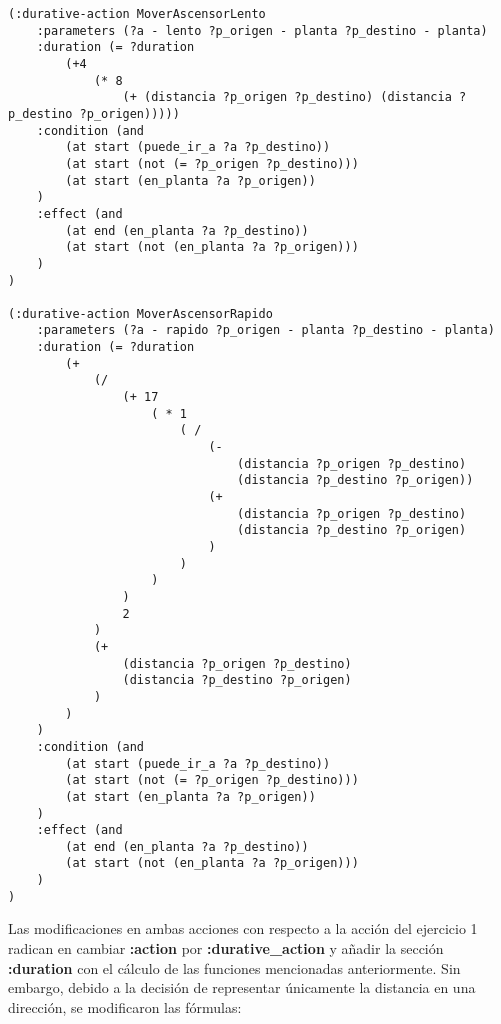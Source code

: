 \documentclass{article}
\begin{document}
\begin{verbatim}
(:durative-action MoverAscensorLento
    :parameters (?a - lento ?p_origen - planta ?p_destino - planta)
    :duration (= ?duration
        (+4
            (* 8
                (+ (distancia ?p_origen ?p_destino) (distancia ?p_destino ?p_origen)))))
    :condition (and
        (at start (puede_ir_a ?a ?p_destino))
        (at start (not (= ?p_origen ?p_destino)))
        (at start (en_planta ?a ?p_origen))
    )
    :effect (and
        (at end (en_planta ?a ?p_destino))
        (at start (not (en_planta ?a ?p_origen)))
    )
)

(:durative-action MoverAscensorRapido
    :parameters (?a - rapido ?p_origen - planta ?p_destino - planta)
    :duration (= ?duration
        (+
            (/
                (+ 17
                    ( * 1
                        ( /
                            (-
                                (distancia ?p_origen ?p_destino)
                                (distancia ?p_destino ?p_origen))
                            (+
                                (distancia ?p_origen ?p_destino)
                                (distancia ?p_destino ?p_origen)
                            )
                        )
                    )
                ) 
                2
            )
            (+
                (distancia ?p_origen ?p_destino)
                (distancia ?p_destino ?p_origen)
            )
        )
    )
    :condition (and
        (at start (puede_ir_a ?a ?p_destino))
        (at start (not (= ?p_origen ?p_destino)))
        (at start (en_planta ?a ?p_origen))
    )
    :effect (and
        (at end (en_planta ?a ?p_destino))
        (at start (not (en_planta ?a ?p_origen)))
    )
)
\end{verbatim}

Las modificaciones en ambas acciones con respecto a la acción del ejercicio 1 radican en cambiar \textbf{:action} por \textbf{:durative\_action} y añadir la sección \textbf{:duration} con el cálculo de las funciones mencionadas anteriormente. Sin embargo, debido a la decisión de representar únicamente la distancia en una dirección, se modificaron las fórmulas:
\end{document}
